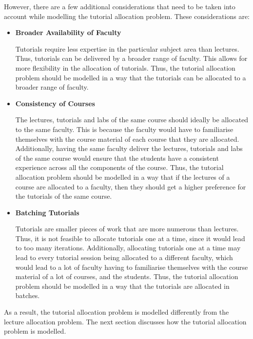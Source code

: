 However, there are a few additional considerations that need to be taken into account while modelling the tutorial allocation problem. These considerations are:

\begin{itemize}
  \item \textbf{Broader Availability of Faculty}

        Tutorials require less expertise in the particular subject area than lectures. Thus, tutorials can be delivered by a broader range of faculty. This allows for more flexibility in the allocation of tutorials. Thus, the tutorial allocation problem should be modelled in a way that the tutorials can be allocated to a broader range of faculty.

  \item \textbf{Consistency of Courses}

        The lectures, tutorials and labs of the same course should ideally be allocated to the same faculty. This is because the faculty would have to familiarise themselves with the course material of each course that they are allocated. Additionally, having the same faculty deliver the lectures, tutorials and labs of the same course would ensure that the students have a consistent experience across all the components of the course. Thus, the tutorial allocation problem should be modelled in a way that if the lectures of a course are allocated to a faculty, then they should get a higher preference for the tutorials of the same course.

  \item \textbf{Batching Tutorials}

        Tutorials are smaller pieces of work that are more numerous than lectures. Thus, it is not feasible to allocate tutorials one at a time, since it would lead to too many iterations. Additionally, allocating tutorials one at a time may lead to every tutorial session being allocated to a different faculty, which would lead to a lot of faculty having to familiarise themselves with the course material of a lot of courses, and the students. Thus, the tutorial allocation problem should be modelled in a way that the tutorials are allocated in batches.

\end{itemize}

As a result, the tutorial allocation problem is modelled differently from the lecture allocation problem. The next section discusses how the tutorial allocation problem is modelled.

